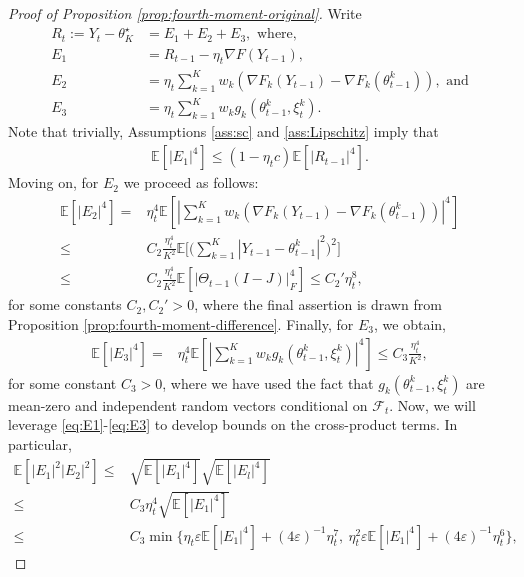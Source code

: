 \documentclass[a4paper,11pt]{article}
\numberwithin{equation}{section}
\theoremstyle{plain}
\theoremstyle{remark}
\def\IE{\mathbb{E}}
\newcommand{\minparam}{\theta^\star_K}
\begin{document}
\begin{proof}[Proof of Proposition \ref{prop:fourth-moment-original}]
    Write  
\begin{align}
    R_t:=Y_t - \minparam &= E_1 + E_2 + E_3, \text{ where},\nonumber\\
    E_1 & = R_{t-1} - \eta_t\nabla F(Y_{t-1}) , \nonumber\\
    E_2 &= \eta_t \sum_{k=1}^K w_k (\nabla F_k(Y_{t-1}) - \nabla F_k(\theta_{t-1}^k)),  \text{ and} \nonumber\\
    E_3 &= \eta_t \sum_{k=1}^K w_k g_k(\theta_{t-1}^k, \xi_t^k). \label{eq:foruth-moment-decomp}
\end{align}
Note that trivially, Assumptions \ref{ass:sc} and \ref{ass:Lipschitz} imply that 
\begin{align}
    \IE[|E_1|^4] \leq (1- \eta_t c)\IE[|R_{t-1}|^4] \label{eq:E1}.
\end{align}
Moving on, for $E_2$ we proceed as follows:
\begin{align}
    \IE[|E_2|^4] = & \eta_t^4 \IE[|\sum_{k=1}^K w_k(\nabla F_k(Y_{t-1}) - \nabla F_k(\theta_{t-1}^k))|^4] \nonumber\\
    \leq & C_2\frac{\eta_t^4}{K^2} \IE\bigg[ \Big( \sum_{k=1}^K |Y_{t-1} - \theta_{t-1}^k|^2 \Big)^2 \bigg] \nonumber\\
    \leq & C_2\frac{\eta_t^4}{K^2} \IE[|\Theta_{t-1}(I-J)|_F^4] \leq C_2'{\eta_t^8} \label{eq:E2},
\end{align}
for some constants $C_2, C_2'>0$, where the final assertion is drawn from Proposition \ref{prop:fourth-moment-difference}. Finally, for $E_3$, we obtain,
\begin{align}
    \IE[|E_3|^4] = & \eta_t^4 \IE[|\sum_{k=1}^K w_k g_k(\theta_{t-1}^k, \xi_t^k)|^4] \leq  C_3 \frac{\eta_t^4}{K^2} \label{eq:E3},
\end{align}
 for some constant $C_3>0$, where we have used the fact that $g_k(\theta_{t-1}^k, \xi_t^k)$ are mean-zero and independent random vectors conditional on $\mathcal{F}_t$. Now, we will leverage \eqref{eq:E1}-\eqref{eq:E3} to develop bounds on the cross-product terms. In particular,
\begin{align}
    \IE[|E_1|^2 |E_2|^2] \leq & \sqrt{\IE[|E_1|^4]} \sqrt{\IE[|E_l|^4]} \nonumber\\
    \leq  & C_3 \eta_t^4 \sqrt{\IE[|E_1|^4]} \nonumber\\
    \leq & C_3 \min\{\eta_t \varepsilon \IE[|E_1|^4] + (4\varepsilon)^{-1} \eta_t^7 , \  \eta_t^2 \varepsilon \IE[|E_1|^4] + (4\varepsilon)^{-1}  \eta_t^6\}, \label{eq:E1-cross-prods-1}

\end{align}
\end{proof}
\end{document}
